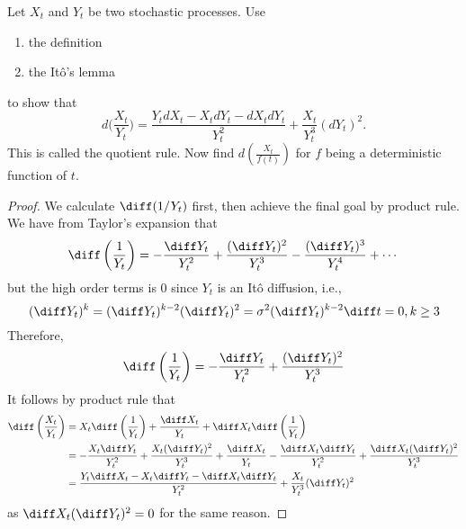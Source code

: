     \problem
    \begin{question}
        Let $X_t$ and $Y_t$ be two stochastic processes.  Use
        \begin{enumerate}[label=(\alph*)]
        \item the definition
        \item the It\^o's lemma
        \end{enumerate}
        to show that
        \[d\Big(\frac{X_t}{Y_t}\Big)=\frac{Y_tdX_t-X_tdY_t-dX_tdY_t}{Y_t^2}
        +\frac{X_t}{Y_t^3}(dY_t)^2.\]
        This is called the quotient rule.  Now find $d(\frac{X_t}{f(t)})$
        for $f$ being a deterministic function of $t$.
    \end{question}
    \begin{subproblem}[(\alph*)]
        \item
        \begin{proof}
            We calculate $\diff(1/Y_t)$ first, then achieve the final goal by
            product rule.
            We have from Taylor's expansion that
            \[\diff\left(\frac{1}{Y_t}\right)
            =-\frac{\diff Y_t}{Y_t^2}+\frac{(\diff Y_t)^2}{Y_t^3}
            -\frac{(\diff Y_t)^3}{Y_t^4}+\cdots\]
            but the high order terms is 0 since $Y_t$ is an It\^o diffusion, i.e.,
            \[(\diff Y_t)^k=(\diff Y_t)^{k-2}(\diff Y_t)^2=\sigma^2(\diff Y_t)^{k-2}\diff t=0
            ,k\geq 3\]
            Therefore,
            \[\diff\left(\frac{1}{Y_t}\right)
            =-\frac{\diff Y_t}{Y_t^2}+\frac{(\diff Y_t)^2}{Y_t^3}\]
            It follows by product rule that
            \[\begin{aligned}
                \diff\left(\frac{X_t}{Y_t}\right)
                &=X_t\diff\left(\frac{1}{Y_t}\right)+\frac{\diff X_t}{Y_t}
                +\diff X_t\diff\left(\frac{1}{Y_t}\right)\\
                &=-\frac{X_t\diff Y_t}{Y_t^2}+\frac{X_t(\diff Y_t)^2}{Y_t^3}
                +\frac{\diff X_t}{Y_t}
                -\frac{\diff X_t\diff Y_t}{Y_t^2}
                +\frac{\diff X_t(\diff Y_t)^2}{Y_t^3}\\
                &=\frac{Y_t\diff X_t-X_t\diff Y_t-\diff X_t\diff Y_t}%
                  {Y_t^2}+\frac{X_t}{Y_t^3}(\diff Y_t)^2
            \end{aligned}\]
            as $\diff X_t(\diff Y_t)^2=0$ for the same reason.
        \end{proof}


\end{subproblem}
